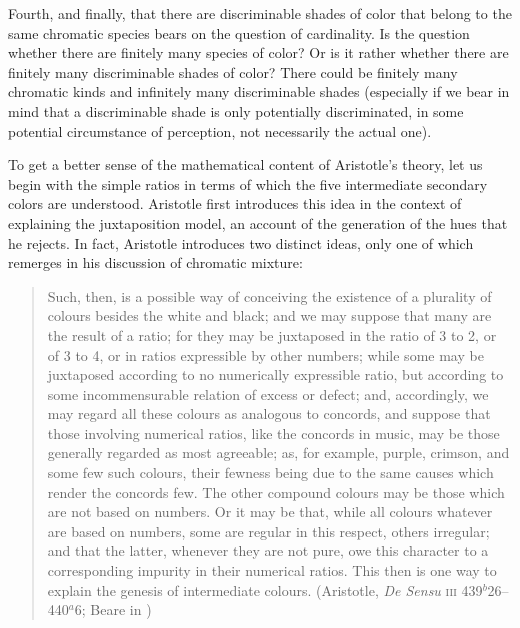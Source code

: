 Fourth, and finally, that there are discriminable shades of color that belong to the same chromatic species bears on the question of cardinality. Is the question whether there are finitely many species of color? Or is it rather whether there are finitely many discriminable shades of color? There could be finitely many chromatic kinds and infinitely many discriminable shades (especially if we bear in mind that a discriminable shade is only potentially discriminated, in some potential circumstance of perception, not necessarily the actual one).

To get a better sense of the mathematical content of Aristotle's theory, let us begin with the simple ratios in terms of which the five intermediate secondary colors are understood. Aristotle first introduces this idea in the context of explaining the juxtaposition model, an account of the generation of the hues that he rejects. In fact, Aristotle introduces two distinct ideas, only one of which remerges in his discussion of chromatic mixture:
\begin{quote}
	Such, then, is a possible way of conceiving the existence of a plurality of colours besides the white and black; and we may suppose that many are the result of a ratio; for they may be juxtaposed in the ratio of 3 to 2, or of 3 to 4, or in ratios expressible by other numbers; while some may be juxtaposed according to no numerically expressible ratio, but according to some incommensurable relation of excess or defect; and, accordingly, we may regard all these colours as analogous to concords, and suppose that those involving numerical ratios, like the concords in music, may be those generally regarded as most agreeable; as, for example, purple, crimson, and some few such colours, their fewness being due to the same causes which render the concords few. The other compound colours may be those which are not based on numbers. Or it may be that, while all colours whatever are based on numbers, some are regular in this respect, others irregular; and that the latter, whenever they are not pure, owe this character to a corresponding impurity in their numerical ratios. This then is one way to explain the genesis of intermediate colours. (Aristotle, \emph{De Sensu} \textsc{iii} 439\( ^{b} \)26--440\( ^{a} \)6; Beare in \citealt[8]{Barnes:1984uq})
\end{quote}

